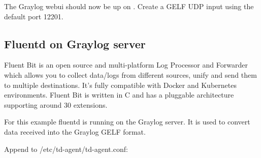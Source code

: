 \documentclass[letterpaper,10pt,english]{sphinxmanual}
\begin{document}
The Graylog webui should now be up on . Create a GELF UDP input using the default port 12201.


\subsection{Fluentd on Graylog server}
\label{\detokenize{monitoring:fluentd-on-graylog-server}}
Fluent Bit is an open source and multi-platform Log Processor and Forwarder which allows you to collect data/logs from different sources, unify and send them to multiple destinations. It’s fully compatible with Docker and Kubernetes environments. Fluent Bit is written in C and has a pluggable architecture supporting around 30 extensions.

For this example fluentd is running on the Graylog server. It is used to convert data received into the Graylog GELF format.

\begin{sphinxVerbatim}[commandchars=\\\{\}]
      
  
 
  
  
 
 
 
\end{sphinxVerbatim}

Append to /etc/td-agent/td-agent.conf:
\end{document}
